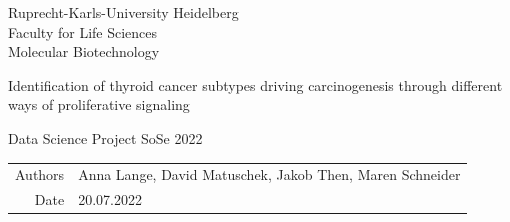 \documentclass[
  11pt,
  parskip,
  oneside]{scrreprt}
\author{}
\date{\vspace{-2.5em}}
\begin{document}
\begin{titlepage}
\centering
    {\Large Ruprecht-Karls-University Heidelberg\\
        Faculty for Life Sciences\\
        Molecular Biotechnology\\}

    {}
    {

        {\Huge Identification of thyroid cancer subtypes driving carcinogenesis through different ways of proliferative signaling }

    }

    {\Large Data Science Project SoSe 2022}


    {\small
        \begin{tabular}{rl}
            Authors & Anna Lange, David Matuschek, Jakob Then, Maren Schneider\\
            Date & 20.07.2022\\
        \end{tabular}
    }


\end{titlepage}

\end{document}

